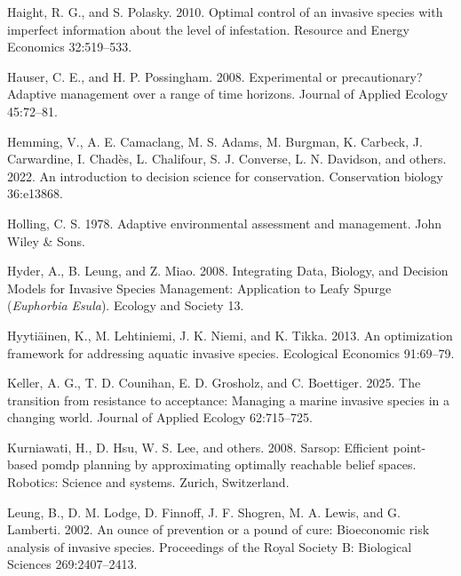 \documentclass[
  11pt,
  a4paper,
]{article}
\newlength{\cslhangindent}
\newenvironment{CSLReferences}[2] %
 {\begin{list}{}{%
  \setlength{\itemindent}{0pt}
  \setlength{\leftmargin}{0pt}
  \setlength{\parsep}{0pt}
  \ifodd #1
   \setlength{\leftmargin}{\cslhangindent}
   \setlength{\itemindent}{-1\cslhangindent}
  \fi
  \setlength{\itemsep}{#2\baselineskip}}}
 {\end{list}}
\begin{document}
\begin{CSLReferences}{1}{0}
Haight, R. G., and S. Polasky. 2010. Optimal control of an invasive species with imperfect information about the level of infestation. Resource and Energy Economics 32:519--533.

Hauser, C. E., and H. P. Possingham. 2008. Experimental or precautionary? {Adaptive} management over a range of time horizons. Journal of Applied Ecology 45:72--81.

{Hemming, V., A. E. Camaclang, M. S. Adams, M. Burgman, K. Carbeck, J. Carwardine, I. Chadès, L. Chalifour, S. J. Converse, L. N. Davidson, and others}. 2022. An introduction to decision science for conservation. Conservation biology 36:e13868.

Holling, C. S. 1978. Adaptive environmental assessment and management. John Wiley \& Sons.

Hyder, A., B. Leung, and Z. Miao. 2008. {Integrating Data}, {Biology}, and {Decision Models} for {Invasive Species Management}: {Application} to {Leafy Spurge} ({\emph{Euphorbia}}{ \emph{Esula}}). Ecology and Society 13.

Hyytiäinen, K., M. Lehtiniemi, J. K. Niemi, and K. Tikka. 2013. An optimization framework for addressing aquatic invasive species. Ecological Economics 91:69--79.

Keller, A. G., T. D. Counihan, E. D. Grosholz, and C. Boettiger. 2025. The transition from resistance to acceptance: Managing a marine invasive species in a changing world. Journal of Applied Ecology 62:715--725.

{Kurniawati, H., D. Hsu, W. S. Lee, and others}. 2008. Sarsop: Efficient point-based pomdp planning by approximating optimally reachable belief spaces. Robotics: Science and systems. Zurich, Switzerland.

Leung, B., D. M. Lodge, D. Finnoff, J. F. Shogren, M. A. Lewis, and G. Lamberti. 2002. An ounce of prevention or a pound of cure: Bioeconomic risk analysis of invasive species. Proceedings of the Royal Society B: Biological Sciences 269:2407--2413.


\end{CSLReferences}
\end{document}
